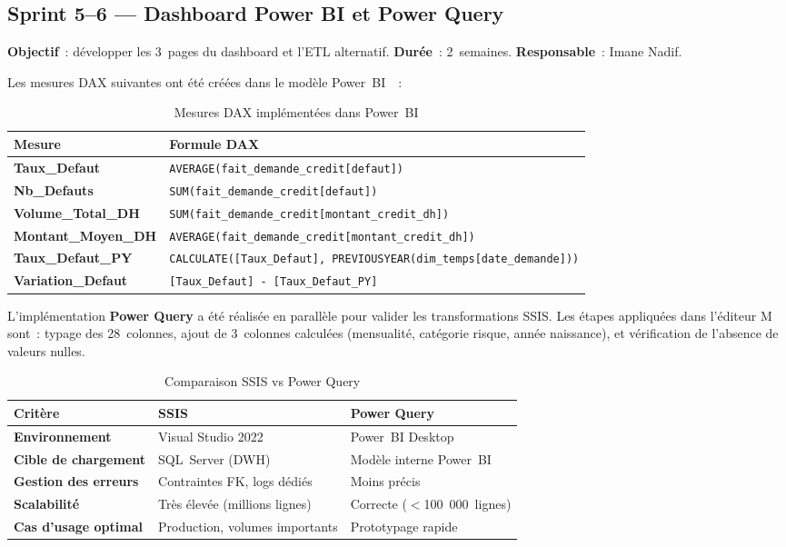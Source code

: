 \documentclass[12pt, a4paper]{report}
\begin{document}
\subsection{Sprint 5--6 --- Dashboard Power BI et Power Query}

\textbf{Objectif}~: développer les 3~pages du dashboard et l'ETL alternatif.
\textbf{Durée}~: 2~semaines. \textbf{Responsable}~: Imane Nadif.

Les mesures DAX suivantes ont été créées dans le modèle Power~BI~\cite{ferrari_dax,cdc_atlas}~:

\begin{table}[H]
\centering
\caption{Mesures DAX implémentées dans Power~BI}
\label{tab:dax}
\renewcommand{\arraystretch}{1.4}
\begin{tabularx}{\textwidth}{>{\ttfamily\bfseries}p{4.8cm} X}
\toprule
\rowcolor{primary!12}
Mesure & Formule DAX \\
\midrule
Taux\_Defaut       & \texttt{AVERAGE(fait\_demande\_credit[defaut])} \\
Nb\_Defauts        & \texttt{SUM(fait\_demande\_credit[defaut])} \\
Volume\_Total\_DH  & \texttt{SUM(fait\_demande\_credit[montant\_credit\_dh])} \\
Montant\_Moyen\_DH & \texttt{AVERAGE(fait\_demande\_credit[montant\_credit\_dh])} \\
Taux\_Defaut\_PY   & \texttt{CALCULATE([Taux\_Defaut], PREVIOUSYEAR(dim\_temps[date\_demande]))} \\
Variation\_Defaut  & \texttt{[Taux\_Defaut] - [Taux\_Defaut\_PY]} \\
\bottomrule
\end{tabularx}
\end{table}

L'implémentation \textbf{Power Query} a été réalisée en parallèle pour valider les
transformations SSIS. Les étapes appliquées dans l'éditeur M sont~: typage des
28~colonnes, ajout de 3~colonnes calculées (mensualité, catégorie risque, année
naissance), et vérification de l'absence de valeurs nulles.

\begin{table}[H]
\centering
\caption{Comparaison SSIS vs Power Query}
\label{tab:ssis_vs_pq}
\renewcommand{\arraystretch}{1.4}
\begin{tabularx}{\textwidth}{>{\bfseries}p{4.5cm} X X}
\toprule
\rowcolor{primary!12}
Critère & SSIS & Power Query \\
\midrule
Environnement & Visual Studio 2022 & Power~BI Desktop \\
Cible de chargement & SQL~Server (DWH) & Modèle interne Power~BI \\
Gestion des erreurs & Contraintes FK, logs dédiés & Moins précis \\
Scalabilité & Très élevée (millions lignes) & Correcte ($<$100~000~lignes) \\
Cas d'usage optimal & Production, volumes importants & Prototypage rapide \\
\bottomrule
\end{tabularx}
\end{table}
\end{document}
